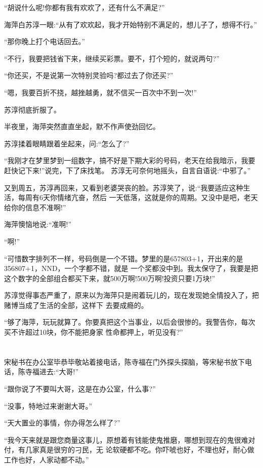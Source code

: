 \documentclass[11pt,a4paper,onecolumn]{article}
\begin{document}
``胡说什么呢!你都有我有欢欢了，还有什么不满足?''

海萍白苏淳一眼:``从有了欢欢起，我才开始特别不满足的，想儿子了，想得不行。''

``那你晚上打个电话回去。''

``不行，我要把钱省下来，继续买彩票。要不，打个短的，就说两句?''

``你还买，不是说第一次特别灵验吗?都过去了你还买?''

``嗯，我要百折不挠，越挫越勇，就不信买一百次中不到一次!''

苏淳彻底折服了。

半夜里，海萍突然直直坐起，默不作声使劲回忆。

苏淳揉着眼睛跟着坐起来，问:``怎么了?''

``我刚才在梦里梦到一组数字，搞不好是下期大彩的号码，老天在给我暗示，我要赶快记下来!''说完，下了床找笔。
苏淳无可奈何地摇头，自言自语说:``中邪了。''

又到周五，苏淳再回来，又看到老婆哭丧的脸。苏淳笑了，说:``我要适应这种生活，每周有6天你情绪亢奋，然后
一天低落，这就是你的周期。又没中是吧，老天给你的信息不准啊!''

海萍懊恼地说:``准啊!''

``啊!''

``可惜数字排列不一样，号码倒是一个不错。梦里的是657803+1，开出来的是356807+1，NND，一个字都不错，就是
一个奖都没中到。我太保守了，我要是把这个数字的全部组合都买下来，就500万啊!500万啊!投资只要1万块!''

苏淳觉得事态严重了，原来以为海萍只是闹着玩儿的，现在发现她全情投入了，把赌博当成了生活的全部，这样下
去要成瘾的。

``够了海萍，玩玩就算了。你要真把这个当事业，以后会很惨的。我警告你，每次买不许超过10块，你不能把身家
性命都押上，听见没有?''

\section[\thesection]{}

宋秘书在办公室毕恭毕敬站着接电话，陈寺福在门外探头探脑，等宋秘书放下电话，陈寺福进去:``大哥!''

``跟你说了不要叫大哥，这是在办公室，什么事?''

``没事，特地过来谢谢大哥。''

``天大置业的事情，你办得怎么样了?''

``我今天来就是跟您商量这事儿，原想着有钱能使鬼推磨，哪想到现在的鬼很难对付，有几家真是很穷的刁民，无
论软硬都不吃。你吓唬也好，不理也好，耐心做工作也好，人家动都不动。''
\end{document}

